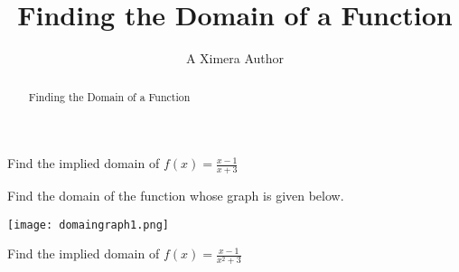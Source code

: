 \documentclass{ximera}
\title{Finding the Domain of a Function}
\author{A Ximera Author}
\begin{document}
\begin{abstract}
Finding the Domain of a Function
\end{abstract}

\maketitle

\begin{problem}
Find the implied domain of $f(x) = \frac{x - 1}{x + 3}$
\begin{multipleChoice}
\end{multipleChoice}
\end{problem}

\begin{problem}
Find the domain of the function whose graph is given below.

\begin{image}
\texttt{[image: domaingraph1.png]}
\end{image}

\begin{multipleChoice}
\choice[correct]{$[-5, -3) \cup (-3, 3)$}
\choice{$[-5, 3]$}
\choice{$[-5, -3) \cup (-3, -1) \cup (-1, 3)$}
\choice{$(-2, -1) \cup [0, 4)$}
\end{multipleChoice}
\end{problem}

\begin{problem}
Find the implied domain of $f(x) = \frac{x - 1}{x^{2} + 3}$
\begin{multipleChoice}
\choice[correct]{$(-\infty, \infty)$}
\end{multipleChoice}
\end{problem}
\end{document}
